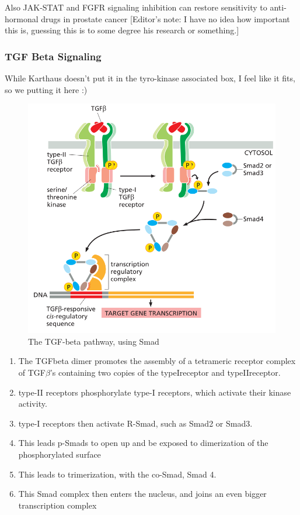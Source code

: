 \documentclass[../main.tex]{subfiles}
\begin{document}
Also JAK-STAT and \gls{FGFR} signaling inhibition can restore sensitivity to anti-hormonal drugs in prostate cancer [Editor's note: I have no idea how important this is, guessing this is to some degree his research or something.] 


\subsubsection{TGF Beta Signaling}
While Karthaus doesn't put it in the tyro-kinase associated box, I feel like it fits, so we putting it here :)

 
\begin{figure}[H]
	\centering
	\includegraphics[width=0.7\linewidth]{TGF_path}
	\caption{The TGF-beta pathway, using Smad}
\end{figure}


\begin{enumerate}
	\item The \gls{TGFbeta} dimer promotes the assembly of a tetrameric receptor complex of TGF$\beta$'s containing two copies of the \gls{typeIreceptor} and \gls{typeIIreceptor}.
	\item type-II receptors phosphorylate type-I receptors, which activate their kinase activity.
	\item type-I receptors then activate R-\gls{Smad}, such as Smad2 or Smad3.
	\item This leads p-Smads to open up and be exposed to dimerization of the phosphorylated surface
	\item This leads to trimerization, with the co-Smad, Smad 4. 
	\item This Smad complex then enters the nucleus, and joins an even bigger transcription complex
\end{enumerate}
\end{document}
